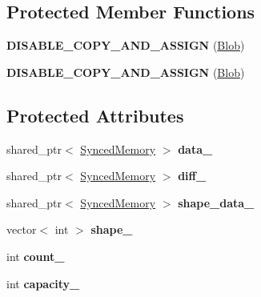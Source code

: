 \subsection*{Protected Member Functions}
\begin{DoxyCompactItemize}
\item 
\mbox{\label{classcaffe_1_1_blob_a603f1a5472e5fae9ca8fec62f6d5c581}} 
{\bfseries D\+I\+S\+A\+B\+L\+E\+\_\+\+C\+O\+P\+Y\+\_\+\+A\+N\+D\+\_\+\+A\+S\+S\+I\+GN} (\mbox{\hyperlink{classcaffe_1_1_blob}{Blob}})
\item 
\mbox{\label{classcaffe_1_1_blob_a603f1a5472e5fae9ca8fec62f6d5c581}} 
{\bfseries D\+I\+S\+A\+B\+L\+E\+\_\+\+C\+O\+P\+Y\+\_\+\+A\+N\+D\+\_\+\+A\+S\+S\+I\+GN} (\mbox{\hyperlink{classcaffe_1_1_blob}{Blob}})
\end{DoxyCompactItemize}
\subsection*{Protected Attributes}
\begin{DoxyCompactItemize}
\item 
\mbox{\label{classcaffe_1_1_blob_a0a9da1f120c8b8cce45f9effa74591f9}} 
shared\+\_\+ptr$<$ \mbox{\hyperlink{classcaffe_1_1_synced_memory}{Synced\+Memory}} $>$ {\bfseries data\+\_\+}
\item 
\mbox{\label{classcaffe_1_1_blob_a7b1e530cf326b0985a459232635e22a3}} 
shared\+\_\+ptr$<$ \mbox{\hyperlink{classcaffe_1_1_synced_memory}{Synced\+Memory}} $>$ {\bfseries diff\+\_\+}
\item 
\mbox{\label{classcaffe_1_1_blob_a4f59f8c843265828cddce7772015f664}} 
shared\+\_\+ptr$<$ \mbox{\hyperlink{classcaffe_1_1_synced_memory}{Synced\+Memory}} $>$ {\bfseries shape\+\_\+data\+\_\+}
\item 
\mbox{\label{classcaffe_1_1_blob_a998cc2ff36fc631acc3db80ac1acf5de}} 
vector$<$ int $>$ {\bfseries shape\+\_\+}
\item 
\mbox{\label{classcaffe_1_1_blob_acf06ea13a3a14f77c178a525c35a3ea0}} 
int {\bfseries count\+\_\+}
\item 
\mbox{\label{classcaffe_1_1_blob_a33b722653651763f4cf07c3658a6de33}} 
int {\bfseries capacity\+\_\+}
\end{DoxyCompactItemize}


